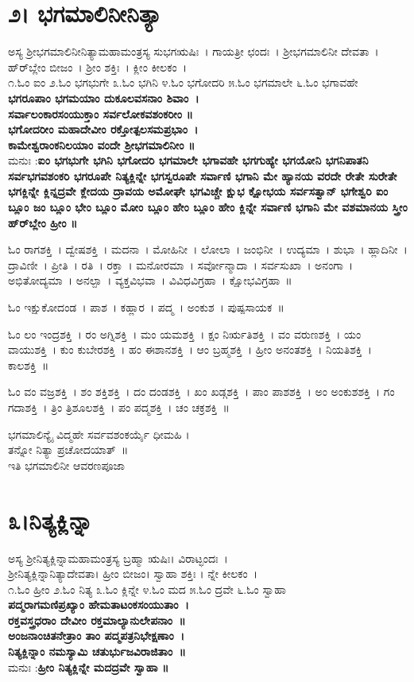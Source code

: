 \section{೨। ಭಗಮಾಲಿನೀನಿತ್ಯಾ}
ಅಸ್ಯ ಶ್ರೀಭಗಮಾಲಿನೀನಿತ್ಯಾಮಹಾಮಂತ್ರಸ್ಯ ಸುಭಗಋಷಿಃ~। ಗಾಯತ್ರೀ ಛಂದಃ~। ಶ್ರೀಭಗಮಾಲಿನೀ ದೇವತಾ~। ಹ್‌ರ್‌ಬ್ಲೇಂ ಬೀಜಂ~।  ಶ್ರೀಂ ಶಕ್ತಿಃ~। ಕ್ಲೀಂ ಕೀಲಕಂ~।\\
೧.ಓಂ ಐಂ  ೨.ಓಂ ಭಗಭುಗೇ ೩.ಓಂ ಭಗಿನಿ  ೪.ಓಂ ಭಗೋದರಿ  ೫.ಓಂ ಭಗಮಾಲೇ ೬.ಓಂ ಭಗಾವಹೇ\\
{\bfseries ಭಗರೂಪಾಂ ಭಗಮಯಾಂ ದುಕೂಲವಸನಾಂ ಶಿವಾಂ~।\\
ಸರ್ವಾಲಂಕಾರಸಂಯುಕ್ತಾಂ ಸರ್ವಲೋಕವಶಂಕರೀಂ ॥\\
ಭಗೋದರೀಂ ಮಹಾದೇವೀಂ ರಕ್ತೋತ್ಪಲಸಮಪ್ರಭಾಂ~।\\
ಕಾಮೇಶ್ವರಾಂಕನಿಲಯಾಂ ವಂದೇ ಶ್ರೀಭಗಮಾಲಿನೀಂ ॥\\}
ಮನುಃ :{\bfseries  ಐಂ ಭಗಭುಗೇ ಭಗಿನಿ ಭಗೋದರಿ ಭಗಮಾಲೇ ಭಗಾವಹೇ ಭಗಗುಹ್ಯೇ ಭಗಯೋನಿ ಭಗನಿಪಾತನಿ ಸರ್ವಭಗವಶಂಕರಿ ಭಗರೂಪೇ ನಿತ್ಯಕ್ಲಿನ್ನೇ ಭಗಸ್ವರೂಪೇ ಸರ್ವಾಣಿ ಭಗಾನಿ ಮೇ ಹ್ಯಾನಯ ವರದೇ ರೇತೇ ಸುರೇತೇ ಭಗಕ್ಲಿನ್ನೇ ಕ್ಲಿನ್ನದ್ರವೇ ಕ್ಲೇದಯ ದ್ರಾವಯ ಅಮೋಘೇ ಭಗವಿಚ್ಚೇ ಕ್ಷುಭ ಕ್ಷೋಭಯ ಸರ್ವಸತ್ವಾನ್ ಭಗೇಶ್ವರಿ ಐಂ ಬ್ಲೂಂ ಜಂ ಬ್ಲೂಂ ಭೇಂ ಬ್ಲೂಂ ಮೋಂ ಬ್ಲೂಂ ಹೇಂ ಬ್ಲೂಂ ಹೇಂ ಕ್ಲಿನ್ನೇ ಸರ್ವಾಣಿ ಭಗಾನಿ ಮೇ ವಶಮಾನಯ ಸ್ತ್ರೀಂ ಹ್‌ರ್‌ಬ್ಲೇಂ ಹ್ರೀಂ ॥}

ಓಂ ರಾಗಶಕ್ತಿ~।  ದ್ವೇಷಶಕ್ತಿ~।  ಮದನಾ~।  ಮೋಹಿನೀ~।  ಲೋಲಾ~।  ಜಂಭಿನೀ~।  ಉದ್ಯಮಾ~।  ಶುಭಾ~।  ಹ್ಲಾದಿನೀ~।  ದ್ರಾವಿಣೀ~।  ಪ್ರೀತಿ~।  ರತಿ~।  ರಕ್ತಾ~।  ಮನೋರಮಾ~।  ಸರ್ವೋನ್ಮಾದಾ~।  ಸರ್ವಸುಖಾ~।  ಅನಂಗಾ~।  ಅಭಿತೋದ್ಯಮಾ~। ಅನಲ್ಪಾ~।  ವ್ಯಕ್ತವಿಭವಾ~।  ವಿವಿಧವಿಗ್ರಹಾ~।  ಕ್ಷೋಭವಿಗ್ರಹಾ~॥ 

ಓಂ ಇಕ್ಷುಕೋದಂಡ~।  ಪಾಶ~।  ಕಹ್ಲಾರ~।  ಪದ್ಮ~।  ಅಂಕುಶ~।  ಪುಷ್ಪಸಾಯಕ~॥ 

ಓಂ ಲಂ ಇಂದ್ರಶಕ್ತಿ~।  ರಂ ಅಗ್ನಿಶಕ್ತಿ~।  ಮಂ ಯಮಶಕ್ತಿ~।  ಕ್ಷಂ ನಿರ್ಋತಿಶಕ್ತಿ~।  ವಂ ವರುಣಶಕ್ತಿ~।  ಯಂ ವಾಯುಶಕ್ತಿ~।  ಕುಂ ಕುಬೇರಶಕ್ತಿ~।  ಹಂ ಈಶಾನಶಕ್ತಿ~।  ಆಂ ಬ್ರಹ್ಮಶಕ್ತಿ~।  ಹ್ರೀಂ ಅನಂತಶಕ್ತಿ~।  ನಿಯತಿಶಕ್ತಿ~।  ಕಾಲಶಕ್ತಿ~॥ 

ಓಂ ವಂ ವಜ್ರಶಕ್ತಿ~।  ಶಂ ಶಕ್ತಿಶಕ್ತಿ~।  ದಂ ದಂಡಶಕ್ತಿ~।  ಖಂ ಖಡ್ಗಶಕ್ತಿ~।  ಪಾಂ ಪಾಶಶಕ್ತಿ~।  ಅಂ ಅಂಕುಶಶಕ್ತಿ~।  ಗಂ ಗದಾಶಕ್ತಿ~।  ತ್ರಿಂ ತ್ರಿಶೂಲಶಕ್ತಿ~।  ಪಂ ಪದ್ಮಶಕ್ತಿ~।  ಚಂ ಚಕ್ರಶಕ್ತಿ~॥ 

ಭಗಮಾಲಿನ್ಯೈ ವಿದ್ಮಹೇ ಸರ್ವವಶಂಕರ್ಯೈ ಧೀಮಹಿ ।\\ತನ್ನೋ ನಿತ್ಯಾ ಪ್ರಚೋದಯಾತ್~॥\\
ಇತಿ ಭಗಮಾಲಿನೀ ಆವರಣಪೂಜಾ
\section{೩।ನಿತ್ಯಕ್ಲಿನ್ನಾ}
ಅಸ್ಯ ಶ್ರೀನಿತ್ಯಕ್ಲಿನ್ನಾಮಹಾಮಂತ್ರಸ್ಯ ಬ್ರಹ್ಮಾ ಋಷಿಃ। ವಿರಾಟ್ಛಂದಃ~।\\ ಶ್ರೀನಿತ್ಯಕ್ಲಿನ್ನಾನಿತ್ಯಾದೇವತಾ। ಹ್ರೀಂ ಬೀಜಂ। ಸ್ವಾಹಾ ಶಕ್ತಿಃ । ನ್ನೇ ಕೀಲಕಂ~।\\
೧.ಓಂ ಹ್ರೀಂ ೨.ಓಂ ನಿತ್ಯ  ೩.ಓಂ ಕ್ಲಿನ್ನೇ ೪.ಓಂ ಮದ ೫.ಓಂ ದ್ರವೇ ೬.ಓಂ ಸ್ವಾಹಾ\\
{\bfseries ಪದ್ಮರಾಗಮಣಿಪ್ರಖ್ಯಾಂ ಹೇಮತಾಟಂಕಸಂಯುತಾಂ~।\\
ರಕ್ತವಸ್ತ್ರಧರಾಂ ದೇವೀಂ ರಕ್ತಮಾಲ್ಯಾನುಲೇಪನಾಂ~॥\\
ಅಂಜನಾಂಚಿತನೇತ್ರಾಂ ತಾಂ ಪದ್ಮಪತ್ರನಿಭೇಕ್ಷಣಾಂ~।\\
ನಿತ್ಯಕ್ಲಿನ್ನಾಂ ನಮಸ್ಯಾಮಿ ಚತುರ್ಭುಜವಿರಾಜಿತಾಂ~॥\\}
ಮನುಃ :{\bfseries  ಹ್ರೀಂ ನಿತ್ಯಕ್ಲಿನ್ನೇ ಮದದ್ರವೇ ಸ್ವಾಹಾ ॥}

